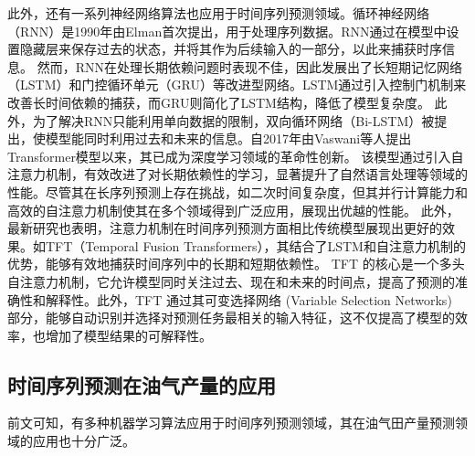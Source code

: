 此外，还有一系列神经网络算法也应用于时间序列预测领域。循环神经网络\cite{li2018independently}（RNN）是1990年由Elman首次提出，用于处理序列数据。RNN通过在模型中设置隐藏层来保存过去的状态，并将其作为后续输入的一部分，以此来捕获时序信息。
然而，RNN在处理长期依赖问题时表现不佳，因此发展出了长短期记忆网络\cite{yu2019review}（LSTM）和门控循环单元\cite{dey2017gate}（GRU）等改进型网络。LSTM通过引入控制门机制来改善长时间依赖的捕获，而GRU则简化了LSTM结构，降低了模型复杂度。
此外，为了解决RNN只能利用单向数据的限制，双向循环网络\cite{graves2005framewise}（Bi-LSTM）被提出，使模型能同时利用过去和未来的信息。自2017年由Vaswani等人提出Transformer模型\cite{vaswani2017attention}以来，其已成为深度学习领域的革命性创新。
该模型通过引入自注意力机制，有效改进了对长期依赖性的学习，显著提升了自然语言处理等领域的性能。尽管其在长序列预测上存在挑战，如二次时间复杂度，但其并行计算能力和高效的自注意力机制使其在多个领域得到广泛应用，展现出优越的性能。
此外，最新研究也表明，注意力机制在时间序列预测方面相比传统模型展现出更好的效果。如TFT\cite{lim2021temporal}（Temporal Fusion Transformers），其结合了LSTM和自注意力机制的优势，能够有效地捕获时间序列中的长期和短期依赖性。
TFT 的核心是一个多头自注意力机制，它允许模型同时关注过去、现在和未来的时间点，提高了预测的准确性和解释性。此外，TFT 通过其可变选择网络 (Variable Selection Networks) 部分，能够自动识别并选择对预测任务最相关的输入特征，这不仅提高了模型的效率，也增加了模型结果的可解释性。
\subsection{时间序列预测在油气产量的应用}
前文可知，有多种机器学习算法应用于时间序列预测领域，其在油气田产量预测领域的应用也十分广泛。

